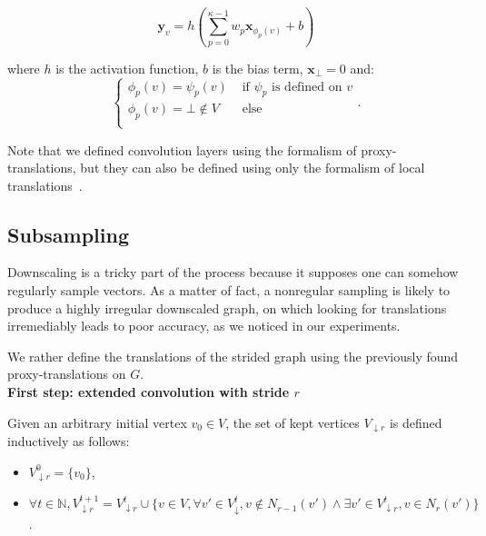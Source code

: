 $$\mathbf{y}_v = h\left(\sum_{p=0}^{\kappa-1}{w_p \mathbf{x}_{\phi_p(v)}} + b\right)$$

where $h$ is the activation function, $b$ is the bias term, $\mathbf{x}_\bot = 0$ and:
$$
\left\{
    \begin{array}{ll}
        \phi_p(v) = \psi_p(v) & \mbox{ if } \psi_p \mbox{ is defined on } v \\
        \phi_p(v) = \bot \notin V & \mbox{ else} \\
    \end{array}
\right..
$$

Note that we defined convolution layers using the formalism of proxy-translations, but they can also be defined using only the formalism of local translations~\cite{pasdeloup2017convolutional}.


\subsection{Subsampling}

Downscaling is a tricky part of the process because it supposes one can somehow regularly sample vectors. As a matter of fact, a nonregular sampling is likely to produce a highly irregular downscaled graph, on which looking for translations irremediably leads to poor accuracy, as we noticed in our experiments.%

We rather define the translations of the strided graph using the previously found proxy-translations on $G$.\\

\noindent\textbf{First step: extended convolution with stride $r$}

Given an arbitrary initial vertex $v_0 \in V$, the set of kept vertices $V_{\downarrow r}$ is defined inductively as follows:
\begin{itemize}[noitemsep,nolistsep]
\item $V_{\downarrow r}^0 = \{v_0\}$,
\item $\forall t \in \mathbb{N}, V_{\downarrow r}^{t+1} = V_{\downarrow r}^t \cup \{v \in V, \forall v' \in V_{\downarrow }^t, v \not\in N_{r-1}(v') \land \exists v' \in V_{\downarrow r}^t, v \in N_{r}(v') \}$.
\end{itemize}

